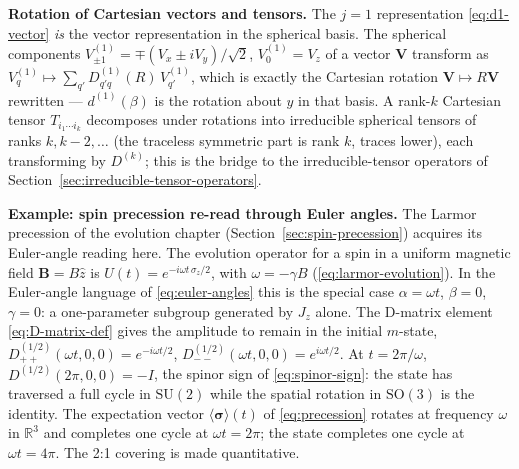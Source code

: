\medskip\noindent\textbf{Rotation of Cartesian vectors and tensors.} The $j=1$ representation \eqref{eq:d1-vector} \emph{is} the vector representation in the spherical basis. The spherical components $V^{(1)}_{\pm1}=\mp(V_x\pm iV_y)/\sqrt2$, $V^{(1)}_{0}=V_z$ of a vector $\bm V$ transform as $V^{(1)}_{q}\mapsto\sum_{q'}D^{(1)}_{q'q}(R)\,V^{(1)}_{q'}$, which is exactly the Cartesian rotation $\bm V\mapsto R\bm V$ rewritten --- $d^{(1)}(\beta)$ is the rotation about $y$ in that basis. A rank-$k$ Cartesian tensor $T_{i_{1}\cdots i_{k}}$ decomposes under rotations into irreducible spherical tensors of ranks $k,k-2,\ldots$ (the traceless symmetric part is rank $k$, traces lower), each transforming by $D^{(k)}$; this is the bridge to the irreducible-tensor operators of Section~\ref{sec:irreducible-tensor-operators}.

\medskip\noindent\textbf{Example: spin precession re-read through Euler angles.} The Larmor precession of the evolution chapter (Section~\ref{sec:spin-precession}) acquires its Euler-angle reading here. The evolution operator for a spin in a uniform magnetic field $\bm B = B\hat{z}$ is $U(t)=e^{-i\omega t\,\sigma_z/2}$, with $\omega=-\gamma B$ (\eqref{eq:larmor-evolution}). In the Euler-angle language of \eqref{eq:euler-angles} this is the special case $\alpha=\omega t$, $\beta=0$, $\gamma=0$: a one-parameter subgroup generated by $J_z$ alone. The D-matrix element \eqref{eq:D-matrix-def} gives the amplitude to remain in the initial $m$-state, $D^{(1/2)}_{++}(\omega t,0,0)=e^{-i\omega t/2}$, $D^{(1/2)}_{--}(\omega t,0,0)=e^{i\omega t/2}$. At $t=2\pi/\omega$, $D^{(1/2)}(2\pi,0,0)=-I$, the spinor sign of \eqref{eq:spinor-sign}: the state has traversed a full cycle in $\mathrm{SU}(2)$ while the spatial rotation in $\mathrm{SO}(3)$ is the identity. The expectation vector $\langle\bm\sigma\rangle(t)$ of \eqref{eq:precession} rotates at frequency $\omega$ in $\mathbb R^{3}$ and completes one cycle at $\omega t=2\pi$; the state completes one cycle at $\omega t=4\pi$. The 2:1 covering is made quantitative.


